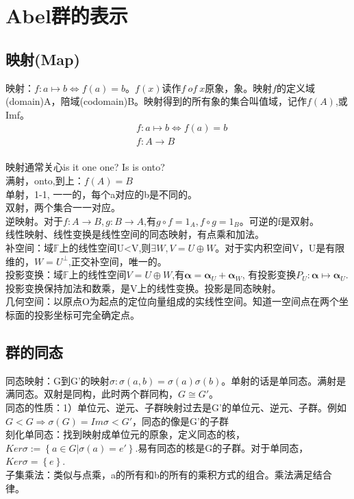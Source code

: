 \section{Abel群的表示}
\subsection{映射(Map)}
映射：$f:a \mapsto b \Leftrightarrow f(a)=b$。$f(x)读作f \ of \ x$原象，象。映射$f$的定义域(domain)A，陪域(codomain)B。映射得到的所有象的集合叫值域，记作$f(A)$,或Imf。
\begin{equation}
  \begin{split}
  &f:a \mapsto b \Leftrightarrow f(a)=b\\
  &f: A \to B\\
  \end{split}
\end{equation}

映射通常关心is it one one? Is is onto? \\
满射，onto,到上：$f(A)=B$\\
单射，1-1, 一一的，每个a对应的b是不同的。\\
双射，两个集合一一对应。\\
逆映射。对于$f:A \to B, g: B \to A$,有$g \circ f =1_A, f \circ g =1_B$。可逆的f是双射。\\

线性映射、线性变换是线性空间的同态映射，有点乘和加法。\\
补空间：域$\mathbb F$上的线性空间U<V,则$\exists W, V=U \oplus W$。对于实内积空间V，U是有限维的，$W=U^{\perp}$,正交补空间，唯一的。\\
投影变换：域$\mathbb F$上的线性空间$V=U \oplus W$,有$\mathbf \alpha =\mathbf \alpha _U+\mathbf \alpha _W$, 有投影变换$P_U:\mathbf \alpha \mapsto \mathbf \alpha _U$.投影变换保持加法和数乘，是V上的线性变换。投影是同态映射。\\
几何空间：以原点O为起点的定位向量组成的实线性空间。知道一空间点在两个坐标面的投影坐标可完全确定点。

\subsection{群的同态}
同态映射：G到G'的映射$\sigma: \sigma(a,b)=\sigma(a) \sigma(b)$。单射的话是单同态。满射是满同态。双射是同构，此时两个群同构，$G \cong G'$。\\
同态的性质：1）单位元、逆元、子群映射过去是G’的单位元、逆元、子群。例如$G<G \Rightarrow \sigma(G)=Im\sigma <G'$，同态的像是G'的子群\\
刻化单同态：找到映射成单位元的原象，定义同态的核，$Ker\sigma:=\left\{ a \in G | \sigma(a)=e' \right\}$.易有同态的核是G的子群。对于单同态，$Ker\sigma=\left\{ e \right\}$.\\
子集乘法：类似与点乘，a的所有和b的所有的乘积方式的组合。乘法满足结合律。\\

